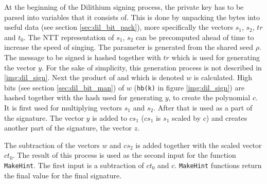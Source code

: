 At the beginning of the Dilithium signing process, the private key has to be parsed into variables that it consists of. This is done by unpacking the bytes into useful data (see section \ref{sec:dil_bit_pack}), more specifically the vectors $s_1$, $s_2$, $tr$ and $t_0$. The NTT representation of $s_1$, $s_2$ can be precomputed ahead of time to increase the speed of singing. The parameter  is generated from the shared seed $\rho$. The message to be signed is hashed together with $tr$ which is used for generating the vector $y$. For the sake of simplicity, this generation process is not described in \ref{img:dil_sign}. Next the product of  and  which is denoted $w$ is calculated. High bits (see section \ref{sec:dil_bit_man}) of $w$ (\texttt{hb(k)} in figure \ref{img:dil_sign}) are hashed together with the hash used for generating $y$, to create the polynomial $c$. It is first used for multiplying vectors $s_1$ and $s_2$. After that is used as a part of the signature. The vector $y$ is added to $cs_1$ ($cs_1$ is $s_1$ scaled by $c$) and creates another part of the signature, the vector $z$.

The subtraction of the vectors $w$ and $cs_2$ is added together with the scaled vector $ct_0$. The result of this process is used as the second input for the function \texttt{MakeHint}. The first input is a subtraction of $ct_0$ and $c$. \texttt{MakeHint} functions return the final value for the final signature.

